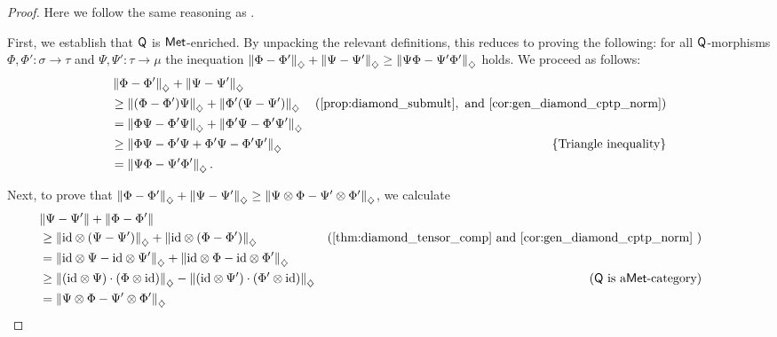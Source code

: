 \begin{proof}
  Here we follow the same reasoning as \cite[Proof of  Proposition 4.1]{dahlqvist2023syntactic}.

  First, we establish that $\mathsf{Q}$ is $\mathsf{Met}$-enriched. By unpacking the relevant definitions, this reduces to proving the following: for all $\mathsf{Q}$-morphisms $\Phi, \Phi' : \sigma \to \tau$ and $\Psi, \Psi' : \tau \to \mu$ the inequation $\left\lVert \Phi-\Phi' \right\rVert_{\diamondsuit} + \left\lVert \Psi-\Psi' \right\rVert_{\diamondsuit} \geq \left\lVert \Psi\Phi-\Psi'\Phi' \right\rVert_{\diamondsuit} $ holds. 
  We proceed as follows:
\begin{align*}
  & \diamondnorm{\Phi - \Phi'} + \diamondnorm{\Psi - \Psi'} \\
&\geq \diamondnorm{(\Phi - \Phi')\Psi} +  \diamondnorm{\Phi'(\Psi - \Psi')}  & (\text{\autoref{prop:diamond_submult}}, \text{ and \autoref{cor:gen_diamond_cptp_norm}}) \\
& = \diamondnorm{\Phi \Psi- \Phi' \Psi} +  \diamondnorm{\Phi'\Psi - \Phi' \Psi'} \\
& \geq  \diamondnorm{\Phi \Psi- \Phi' \Psi + \Phi'\Psi - \Phi' \Psi' }  & \{ \text{Triangle inequality} \} \\
&= \diamondnorm{\Psi\Phi-\Psi'\Phi'}.
\end{align*}

  Next, to prove that  $\left\lVert \Phi-\Phi' \right\rVert_{\diamondsuit} + \left\lVert \Psi-\Psi' \right\rVert_{\diamondsuit} \geq \left\lVert \Psi \otimes \Phi-\Psi' \otimes \Phi' \right\rVert_{\diamondsuit} $, we calculate
  \begin{align*}
      & \hspace{-30pt} \|\Psi - \Psi'\| + \|\Phi - \Phi'\| \\
      & \hspace{-30pt} \geq \diamondnorm{\id \otimes \left(\Psi-\Psi'\right)} + \diamondnorm{\id \otimes \left(\Phi-\Phi'\right)} & (\text{\autoref{thm:diamond_tensor_comp} and \autoref{cor:gen_diamond_cptp_norm} })  \\
      &\hspace{-30pt} =  \diamondnorm{\id \otimes \Psi- \id \otimes\Psi'} + \diamondnorm{\id \otimes \Phi- \id \otimes\Phi'} \\
      &\hspace{-30pt} \geq \diamondnorm{\left( \id \otimes \Psi \right) \cdot \left( \Phi \otimes \id \right)} -  \diamondnorm{\left( \id \otimes \Psi' \right) \cdot \left( \Phi' \otimes \id \right)} & (\catQ \text{ is a} \mathsf{Met}\text{-category}) \\
      &\hspace{-30pt} = \diamondnorm{\Psi \otimes \Phi - \Psi' \otimes \Phi'}
  \end{align*}

\end{proof}

